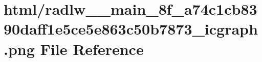 \hypertarget{radlw____main__8f__a74c1cb8390daff1e5ce5e863c50b7873__icgraph_8png}{}\section{html/radlw\+\_\+\+\_\+main\+\_\+8f\+\_\+a74c1cb8390daff1e5ce5e863c50b7873\+\_\+icgraph.png File Reference}
\label{radlw____main__8f__a74c1cb8390daff1e5ce5e863c50b7873__icgraph_8png}
